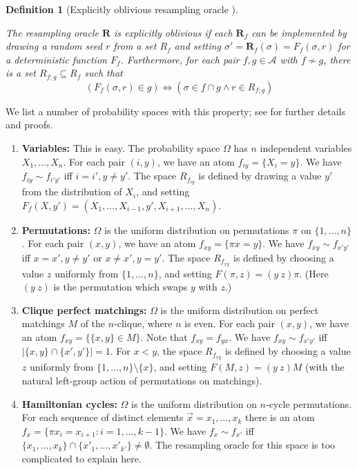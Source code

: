 \documentclass[11pt]{article}
\newtheorem{definition}[theorem]{Definition}
\begin{document}
\begin{definition}[Explicitly oblivious resampling oracle \cite{ParallelHarris}]
  \label{obliv-def}

  The resampling oracle $\mathbf R$ is \emph{explicitly oblivious} 
if each $\mathbf R_f$ can be implemented by drawing a random seed $r$ from a set $R_f$ and setting $\sigma' = \mathbf R_f(\sigma) =  F_f( \sigma, r)$ for a \emph{deterministic} function $F_f$. Furthermore, for each pair $f, g \in \mathcal A$ with $f \not \sim g$, there is a set $R_{f;g} \subseteq R_f$ such that $$
(F_f(\sigma, r) \in g ) \Leftrightarrow (\sigma \in f \cap g \wedge  r \in R_{f;g})
  $$
\end{definition}

We list a number of probability spaces with this property; see \cite{ParallelHarris} for further details and proofs.
\begin{enumerate}
\item \textbf{Variables:} This is easy. The probability space $\Omega$ has $n$ independent variables $X_1, \dots, X_n$. For each pair $(i,y)$, we have an atom $f_{iy} = \{ X_{i}  = y \}$. We have $f_{iy} \sim f_{i'y'}$ iff $i = i', y \neq y'$. The space $R_{f_{iy}}$ is defined by drawing a value $y'$ from the distribution of $X_i$, and setting $F_f(X, y') = (X_1, \dots, X_{i-1}, y', X_{i+1}, \dots, X_n)$.

\item \textbf{Permutations:} $\Omega$ is the uniform distribution on permutations $\pi$ on $\{1, \dots, n \}$.  For each pair $(x,y)$, we have an atom $f_{xy} = \{ \pi x  = y \}$. We have $f_{xy} \sim f_{x'y'}$ iff $x = x', y \neq y'$ or $x \neq x', y = y'$. The space $R_{f_{xy}}$ is defined by choosing a value $z$ uniformly from $ \{1, \dots, n \}$, and setting $F(\pi, z) = (y \ z) \pi$. (Here $(y \ z)$ is the permutation which swaps $y$ with $z$.)


\item \textbf{Clique perfect matchings:}  $\Omega$ is the uniform distribution on perfect matchings $M$ of the $n$-clique, where $n$ is even. For each pair $(x,y)$, we have an atom $f_{xy} = \{ \{x, y \} \in M \}$. Note that $f_{xy} = f_{yx}$.  We have $f_{xy} \sim f_{x'y'}$ iff $| \{ x, y \} \cap \{x', y' \} |= 1 $. For $x < y$, the space $R_{f_{xy}}$ is defined by choosing a value $z$ uniformly from $\{1, \dots, n \} \setminus \{x \}$, and setting $F(M, z) = (y \ z) M$ (with the natural left-group action of permutations on matchings).

\item \textbf{Hamiltonian cycles:} $\Omega$ is the uniform distribution on $n$-cycle permutations.  For each sequence of distinct elements $\vec x = x_1, \dots, x_k$ there is an atom $f_{x} = \{ \pi x_i = x_{i+1}: i = 1, \dots, k-1 \}$. We have $f_{x} \sim f_{x'}$ iff $\{x_1, \dots, x_k \} \cap \{x'_1, \dots, x'_{k'} \} \neq \emptyset$. The resampling oracle for this space is too complicated to explain here.
\end{enumerate}
\end{document}
